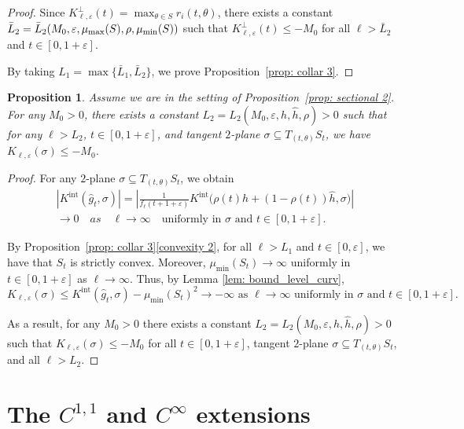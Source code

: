 \documentclass[JEP,XML,SOM,Unicode,NoFloatCountersInSection]{cedram}
\newcommand{\Int}{\mathrm{int}}
\newtheorem{proposition}[theorem]{Proposition}
\theoremstyle{definition}
\let\eps\varepsilon
\renewcommand{\>}{{\rangle}}
\newcommand{\<}{{\langle}}
\begin{document}
\begin{proof}
Since $K^\perp_{\ell,\eps}(t)=\max_{\theta\in S} r_i(t,\theta)$, there exists a constant $\bar L_2=\bar L_2(M_0,\eps, \mu_{\max}(S), \rho,\\ \mu_{\min}(S))$ such that $K^\perp_{\ell,\eps}(t)\leq-M_0$ for all $\ell>\bar L_2$ and $t\in[0,1+\eps]$.

By taking $L_1 = \max\{\bar L_1, \bar L_2\}$, we prove Proposition~\ref{prop: collar 3}.
\end{proof}

\begin{proposition}\label{prop: level sectional 2}
Assume we are in the setting of Proposition~\ref{prop: sectional 2}. For any \hbox{$M_0\!>\!0$}, there exists a constant $L_2=L_2(M_0,\eps, h, \hat h, \rho)>0$ such that for any $\ell>L_2$, $t\in[0,1+\eps]$, and tangent $2$-plane $\sigma\subseteq T_{(t,\theta)}S_t$, we have $K_{\ell,\eps}(\sigma)\leq -M_0$.
\end{proposition}

\begin{proof}
For any $2$-plane $\sigma\subseteq T_{(t,\theta)}S_t$, we obtain
\begin{multline*}
|K^{\Int}(\hat g_t,\sigma)| = \left|\frac{1}{f_\ell(t+1+\eps)}K^{\Int}\bigl(\rho(t)h+(1-\rho(t))\hat h,\sigma\bigr)\right|\\
\to 0 \quad {as }\quad \ell\rightarrow\infty\quad \text{uniformly in $\sigma$ and $t\in[0,1+\eps]$.}
\end{multline*}

By Proposition~\ref{prop: collar 3}\eqref{convexity 2}, for all $\ell\!>\!L_1$ and $t\!\in\![0,\eps]$, we have that $S_t$ is strictly convex. Moreover, $\mu_{\min}(S_t)\to\infty$ uniformly in $t\in[0,1+\eps]$ as $\ell\to\infty$. Thus, by Lemma \ref{lem: bound_level_curv},
\[
K_{\ell,\eps}(\sigma)\leq K^{\Int}(\hat g_t, \sigma)-\mu_{\min}(S_t)^2\to -\infty \text{ as } \ell \rightarrow\infty \text{ uniformly in } \sigma \text{ and } t\in [0,1+\eps].
\]

As a result, for any $M_0>0$ there exists a constant $L_2=L_2(M_0,\eps, h, \hat h, \rho)>0$ such that $K_{\ell,\eps}(\sigma)\leq -M_0$ for all $t\in[0,1+\eps]$, tangent $2$-plane $\sigma\subseteq T_{(t,\theta)}S_t$, and all $\ell>L_2$.
\end{proof}

\section{The \texorpdfstring{$C^{1,1}$ and $C^{\infty}$}{C} extensions}\label{sec: metric_ext}
\end{document}
